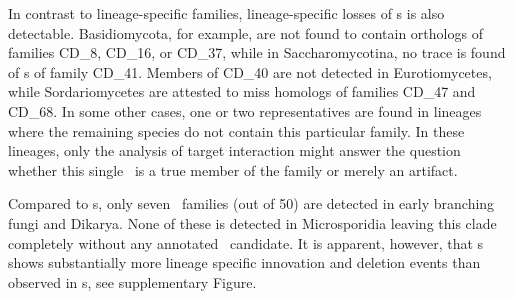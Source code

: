 In contrast to lineage-specific families, lineage-specific losses of
\sno s is also detectable. Basidiomycota, for example, are not found
to contain orthologs of families CD\_8, CD\_16, or CD\_37, while in
Saccharomycotina, no trace is found of \sno s of family
CD\_41. Members of CD\_40 are not detected in Eurotiomycetes, while
Sordariomycetes are attested to miss homologs of families CD\_47 and
CD\_68. In some other cases, one or two representatives
are found in lineages where the remaining species do not contain this
particular family. In these lineages, only the analysis of target
interaction might answer the question whether this single \sno\ is
a true member of the family or merely an artifact.


%

Compared to \cd s, only seven \haca\ families (out of 50) are detected in early branching fungi
and Dikarya. None of these is detected in Microsporidia
leaving this clade completely without any annotated \sno\ candidate. It
is apparent, however, that \haca s shows substantially
more lineage specific innovation and deletion events than observed in \cd s, see supplementary Figure.

